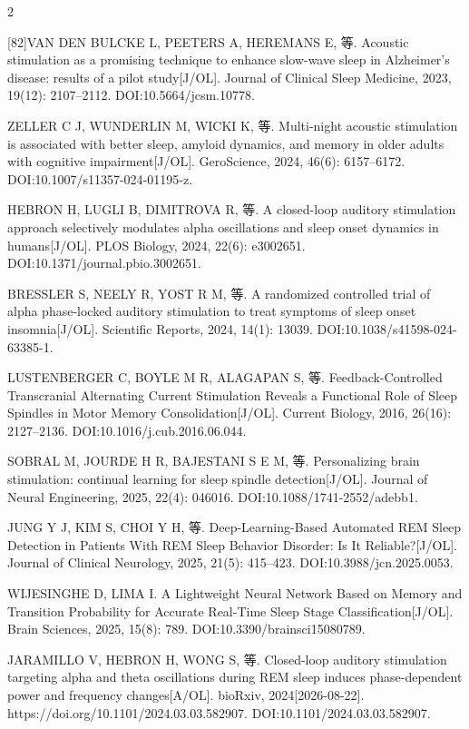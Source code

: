 \documentclass[UTF8,zihao=5,fontset=none]{ctexart}
\begin{document}
\begin{multicols}{2}
{[82]\quad VAN DEN BULCKE L, PEETERS A, HEREMANS E, 等. Acoustic stimulation as a promising technique to enhance slow-wave sleep in Alzheimer’s disease: results of a pilot study[J/OL]. Journal of Clinical Sleep Medicine, 2023, 19(12): 2107--2112. DOI:10.5664/jcsm.10778.\par
[83]\quad ZELLER C J, WUNDERLIN M, WICKI K, 等. Multi-night acoustic stimulation is associated with better sleep, amyloid dynamics, and memory in older adults with cognitive impairment[J/OL]. GeroScience, 2024, 46(6): 6157--6172. DOI:10.1007/s11357-024-01195-z.\par
[84]\quad HEBRON H, LUGLI B, DIMITROVA R, 等. A closed-loop auditory stimulation approach selectively modulates alpha oscillations and sleep onset dynamics in humans[J/OL]. PLOS Biology, 2024, 22(6): e3002651. DOI:10.1371/journal.pbio.3002651.\par
[85]\quad BRESSLER S, NEELY R, YOST R M, 等. A randomized controlled trial of alpha phase-locked auditory stimulation to treat symptoms of sleep onset insomnia[J/OL]. Scientific Reports, 2024, 14(1): 13039. DOI:10.1038/s41598-024-63385-1.\par
[86]\quad LUSTENBERGER C, BOYLE M R, ALAGAPAN S, 等. Feedback-Controlled Transcranial Alternating Current Stimulation Reveals a Functional Role of Sleep Spindles in Motor Memory Consolidation[J/OL]. Current Biology, 2016, 26(16): 2127--2136. DOI:10.1016/j.cub.2016.06.044.\par
[87]\quad SOBRAL M, JOURDE H R, BAJESTANI S E M, 等. Personalizing brain stimulation: continual learning for sleep spindle detection[J/OL]. Journal of Neural Engineering, 2025, 22(4): 046016. DOI:10.1088/1741-2552/adebb1.\par
[88]\quad JUNG Y J, KIM S, CHOI Y H, 等. Deep-Learning-Based Automated REM Sleep Detection in Patients With REM Sleep Behavior Disorder: Is It Reliable?[J/OL]. Journal of Clinical Neurology, 2025, 21(5): 415--423. DOI:10.3988/jcn.2025.0053.\par
[89]\quad WIJESINGHE D, LIMA I. A Lightweight Neural Network Based on Memory and Transition Probability for Accurate Real-Time Sleep Stage Classification[J/OL]. Brain Sciences, 2025, 15(8): 789. DOI:10.3390/brainsci15080789.\par
[90]\quad JARAMILLO V, HEBRON H, WONG S, 等. Closed-loop auditory stimulation targeting alpha and theta oscillations during REM sleep induces phase-dependent power and frequency changes[A/OL]. bioRxiv, 2024[2026-08-22]. https://doi.org/10.1101/2024.03.03.582907. DOI:10.1101/2024.03.03.582907.\par
}
\end{multicols}
\end{document}
